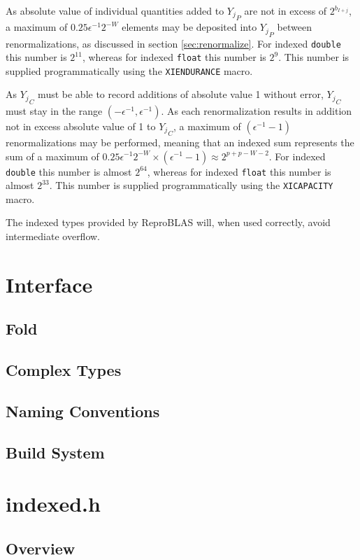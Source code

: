 \documentclass[12pt]{article}
\theoremstyle{plain}
\numberwithin{equation}{section}
\begin{document}
    As absolute value of individual quantities added to ${Y_j}_P$ are not in excess of $2^{b_{I + j}}$, a maximum of $0.25\epsilon^{-1}2^{-W}$ elements may be deposited into ${Y_j}_P$ between renormalizations, as discussed in section \ref{sec:renormalize}. For indexed \verb|double| this number is $2^{11}$, whereas for indexed \verb|float| this number is $2^9$. This number is supplied programmatically using the \verb|XIENDURANCE| macro.

    As ${Y_j}_C$ must be able to record additions of absolute value 1 without error, ${Y_j}_C$ must stay in the range $(-\epsilon^{-1}, \epsilon^{-1})$. As each renormalization results in addition not in excess absolute value of 1 to ${Y_j}_C$, a maximum of $(\epsilon^{-1} - 1)$ renormalizations may be performed, meaning that an indexed sum represents the sum of a maximum of $0.25\epsilon^{-1}2^{-W} \times (\epsilon^{-1} - 1) \approx 2^{p + p - W - 2}$. For indexed \verb|double| this number is almost $2^{64}$, whereas for indexed \verb|float| this number is almost $2^{33}$. This number is supplied programmatically using the \verb|XICAPACITY| macro.

    The indexed types provided by ReproBLAS will, when used correctly, avoid intermediate overflow.

\section{Interface}
  \subsection{Fold}
  \subsection{Complex Types}
  \subsection{Naming Conventions}
  \subsection{Build System}
\section{indexed.h}
  \subsection{Overview}
\end{document}
